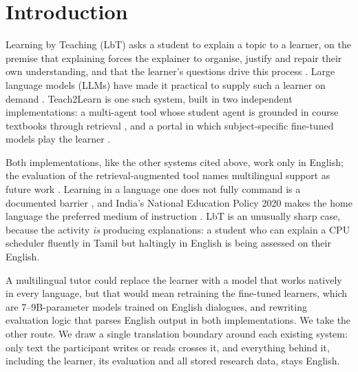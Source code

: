 \documentclass[pdflatex,sn-mathphys-num]{sn-jnl}%
\theoremstyle{thmstyleone}%
\theoremstyle{thmstyletwo}%
\theoremstyle{thmstylethree}%
\begin{document}
\maketitle

\section{Introduction}\label{sec:intro}

Learning by Teaching (LbT) asks a student to explain a topic to a learner, on the premise that
explaining forces the explainer to organise, justify and repair their own understanding, and that
the learner's questions drive this process \cite{roscoe2007,biswas2005}. Large language models
(LLMs) have made it practical to supply such a learner on demand
\cite{jin2024teach,ma2024debugging,rogers2025playing}. Teach2Learn is one such system, built in two
independent implementations: a multi-agent tool whose student agent is grounded in course textbooks
through retrieval \cite{lahoria2025teach2learn}, and a portal in which subject-specific fine-tuned
models play the learner \cite{finetunedT2L}.

Both implementations, like the other systems cited above, work only in English; the evaluation of
the retrieval-augmented tool names multilingual support as future work \cite{lahoria2025teach2learn}.
Learning in a language one does not fully command is a documented barrier
\cite{unesco2016language}, and India's National Education Policy 2020 makes the home language the
preferred medium of instruction \cite{nep2020}. LbT is an unusually sharp case, because the activity
\emph{is} producing explanations: a student who can explain a CPU scheduler fluently in Tamil but
haltingly in English is being assessed on their English.

A multilingual tutor could replace the learner with a model that works natively in every language,
but that would mean retraining the fine-tuned learners, which are 7--9B-parameter models trained on
English dialogues, and rewriting evaluation logic that parses English output in both
implementations. We take the other route. We draw a single translation boundary around each existing
system: only text the participant writes or reads crosses it, and everything behind it, including
the learner, its evaluation and all stored research data, stays English.
\end{document}
